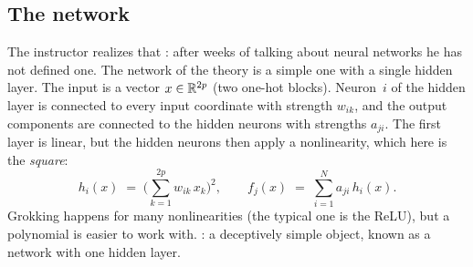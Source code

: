 \subsection{The network}\label{sec:L5-net}
The instructor realizes that : after weeks of talking about neural networks he has not defined one. The network of the theory is a simple one with a single hidden layer. The input is a vector $x\in\mathbb{R}^{2p}$ (two one-hot blocks). Neuron~$i$ of the hidden layer is connected to every input coordinate with strength $w_{ik}$, and the output components are connected to the hidden neurons with strengths $a_{ji}$. The first layer is linear, but the hidden neurons then apply a nonlinearity, which here is the \emph{square}:
\begin{equation}\label{eq:L5-net}
  h_i(x)\;=\;\Big(\sum_{k=1}^{2p}w_{ik}\,x_k\Big)^{2},\qquad f_j(x)\;=\;\sum_{i=1}^{N}a_{ji}\,h_i(x).
\end{equation}
Grokking happens for many nonlinearities (the typical one is the ReLU), but a polynomial is easier to work with. : a deceptively simple object, known as a network with one hidden layer.

